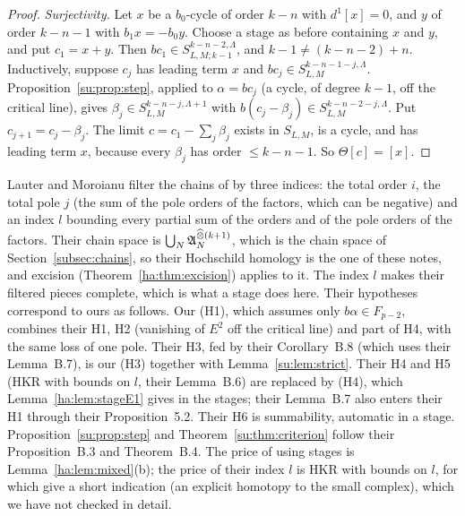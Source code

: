 \begin{proof}
\emph{Surjectivity.} Let \(x\) be a \(b_0\)-cycle of order \(k-n\) with
\(d^1[x]=0\), and \(y\) of order \(k-n-1\) with \(b_1x=-b_0y\). Choose a
stage as before containing \(x\) and \(y\), and put \(c_1=x+y\). Then
\(bc_1\in S^{k-n-2,\Lambda}_{L,M;k-1}\), and \(k-1\ne(k-n-2)+n\).
Inductively, suppose \(c_j\) has leading term \(x\) and \(bc_j\in
S^{k-n-1-j,\Lambda}_{L,M}\). Proposition~\ref{su:prop:step}, applied to
\(\alpha=bc_j\) (a cycle, of degree \(k-1\), off the critical line), gives
\(\beta_j\in S^{k-n-j,\Lambda+1}_{L,M}\) with \(b(c_j-\beta_j)\in
S^{k-n-2-j,\Lambda}_{L,M}\). Put \(c_{j+1}=c_j-\beta_j\). The limit
\(c=c_1-\sum_j\beta_j\) exists in \(S_{L,M}\), is a cycle, and has
leading term \(x\), because every \(\beta_j\) has order \(\le k-n-1\). So
\(\Theta[c]=[x]\).
\end{proof}

\begin{remark}
\label{su:rem:LM}
Lauter and Moroianu filter the chains of \cite{BNcomplete} by three
indices:
the total order \(i\), the total pole \(j\) (the sum of the pole orders of
the factors, which can be negative) and an index \(l\) bounding every
partial sum of the orders and of the pole orders of the factors. Their
chain space is \(\bigcup_N\mathfrak A_{N}^{\mathbin{\widehat\otimes}(k+1)}\), which is the chain space
of Section~\ref{subsec:chains}, so their Hochschild homology is the one of
these notes, and excision (Theorem~\ref{ha:thm:excision}) applies to it.
The index \(l\) makes their filtered pieces complete, which is what a
stage does here. Their hypotheses correspond to ours as follows. Our
(H1), which assumes only \(b\alpha\in F_{p-2}\), combines their H1, H2
(vanishing of \(E^2\) off the critical line) and part of H4, with the
same loss of one pole. Their H3, fed by their Corollary~B.8 (which uses
their Lemma~B.7), is our (H3) together with Lemma~\ref{su:lem:strict}.
Their H4 and H5 (HKR with bounds on \(l\), their Lemma~B.6) are replaced
by (H4), which Lemma~\ref{ha:lem:stageE1} gives in the stages; their
Lemma~B.7 also enters their H1 through their Proposition~5.2. Their H6
is summability, automatic in a stage. Proposition~\ref{su:prop:step} and
Theorem~\ref{su:thm:criterion} follow their Proposition~B.3 and
Theorem~B.4. The price of using stages is Lemma~\ref{ha:lem:mixed}(b);
the price of their index \(l\) is HKR with bounds on \(l\), for which
\cite{LauterMoroianu} give a short indication (an explicit homotopy to the
small complex), which we have not checked in detail.
\end{remark}

